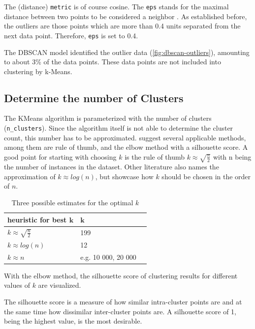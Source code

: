 The (distance) \lstinline|metric| is of course cosine. The \lstinline|eps| stands for the maximal distance between two points to be considered a neighbor \cite{SklearnClusterDBSCAN}. As established before, the outliers are those points which are more than 0.4 units separated from the next data point. Therefore, \lstinline|eps| is set to 0.4. 

The \ac{DBSCAN} model identified the outlier data (\ref{fig:dbscan-outliers}), amounting to about 3\% of the data points. These data points are not included into clustering by k-Means.

\subsection{Determine the number of Clusters}
The KMeans algorithm is parameterized with the number of clusters (\lstinline|n_clusters|). Since the algorithm itself is not able to determine the cluster count, this number has to be approximated.
\cite{kodinariyaReviewDeterminingCluster2013} suggest several applicable methods, among them are rule of thumb, and the elbow method with a silhouette score.
A good point for starting with choosing $k$ is the rule of thumb $k \approx \sqrt{\frac{n}{2}}$ with n being the number of instances in the dataset. Other literature also names the approximation of $k \approx log(n)$, but \cite{maierOptimalConstructionKnearest2009} showcase how $k$ should be chosen in the order of $n$. 

\begin{table}[!h]
	\centering
	\caption{Three possible estimates for the optimal $k$}
	\begin{tabular}{lll}
		\toprule
		\textbf{heuristic for best }$\mathbf{k}$                         & $\mathbf{k}$ &  \\
		\midrule
		$k \approx \sqrt{\frac{n}{2}}$ &  199 &  \\
		\midrule
		$k \approx log(n)$             & 12   &  \\
		\midrule
		$k \approx n$                  &  e.g. 10 000, 20 000& \\
		\bottomrule
		
	\end{tabular}

\label{table:heuristic-k}
\end{table}

With the elbow method, the silhouette score of clustering results for different values of $k$ are visualized. 

The silhouette score is a measure of how similar intra-cluster points are and at the same time how dissimilar inter-cluster points are. A silhouette score of 1, being the highest value, is the most desirable.

